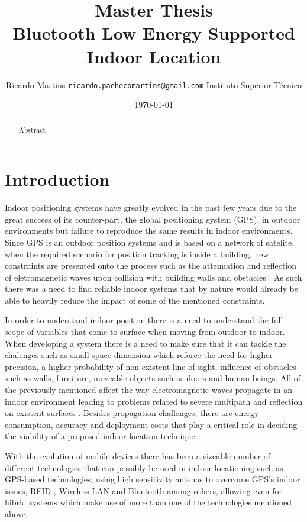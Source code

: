 \documentclass[a4paper]{IEEEtran}
\title{{ \normalsize Master Thesis} \\
	Bluetooth Low Energy Supported Indoor Location}
\author{
	Ricardo Martins {\tt ricardo.pachecomartins@gmail.com}
	Instituto Superior T\'{e}cnico}
\date{\today}
\begin{document}
\maketitle

\begin{abstract}

	Abstract

\end{abstract}

\section{Introduction}
\label{sec:intro}

Indoor positioning systems have greatly evolved in the past few years due to the great success of its counter-part, the global positioning system (GPS), in outdoor environments but failure to reproduce the same results in indoor environments. Since GPS is an outdoor position systems and is based on a network of satelite, when the required scenario for position tracking is inside a building, new constraints are presented onto the process such as the attenuation and reflection of eletromagnetic waves upon collision with building walls and obstacles \cite{surveygps}. As such there was a need to find reliable indoor systems that by nature would already be able to heavily reduce the impact of some of the mentioned constraints.

In order to understand indoor position there is a need to understand the full scope of variables that come to surface when moving from outdoor to indoor. When developing a system there is a need to make sure that it can tackle the chalenges such as small space dimension which reforce the need for higher precision, a higher probability of non existent line of sight, influence of obstacles such as walls, furniture, moveable objects such as doors and human beings\cite{reviewtechniques}. All of the previously mentioned affect the way electromagnetic waves propagate in an indoor environment leading to problems related to severe multipath and reflection on existent surfaces \cite{surveywireless}. Besides propagation challenges, there are energy consumption, accuracy and deployment costs that play a critical role in deciding the viability of a proposed indoor location technique.

With the evolution of mobile devices there has been a sizeable number of different technologies that can possibly be used in indoor locationing \cite{surveywireless,survey2,survey1} such as GPS-based technologies, using high sensitivity antenas to overcome GPS's indoor issues, RFID , Wireless LAN and Bluetooth among others, allowing even for hibrid systems which make use of more than one of the technologies mentioned above. 
\end{document}
